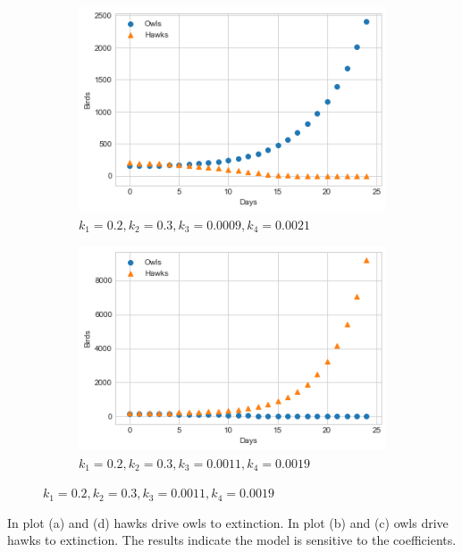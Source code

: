 \documentclass[10pt]{report}
\begin{document}
\begin{enumerate}
\begin{enumerate}[a.]
\begin{figure}[H]
\begin{subfigure}[b]{.5\linewidth}
			\end{subfigure}
		\end{figure}
		\begin{figure}[H]\ContinuedFloat
			\begin{subfigure}[b]{.5\linewidth}
				\caption{$k_1 = 0.2, k_2 = 0.3, k_3 = 0.0009, k_4 = 0.0021$}
				\includegraphics[width=\linewidth]{s1_4/k34-1.png}
			\end{subfigure}%
			\begin{subfigure}[b]{.5\linewidth}
				\caption{$k_1 = 0.2, k_2 = 0.3, k_3 = 0.0011, k_4 = 0.0019$}
				\includegraphics[width=\linewidth]{s1_4/k34-2.png}
			\end{subfigure}
		\end{figure}
		In plot (a) and (d) hawks drive owls to extinction. In plot (b) and (c) owls drive hawks to extinction. The results indicate the model is sensitive to the coefficients.
		

\end{enumerate}
\end{enumerate}
\end{document}
